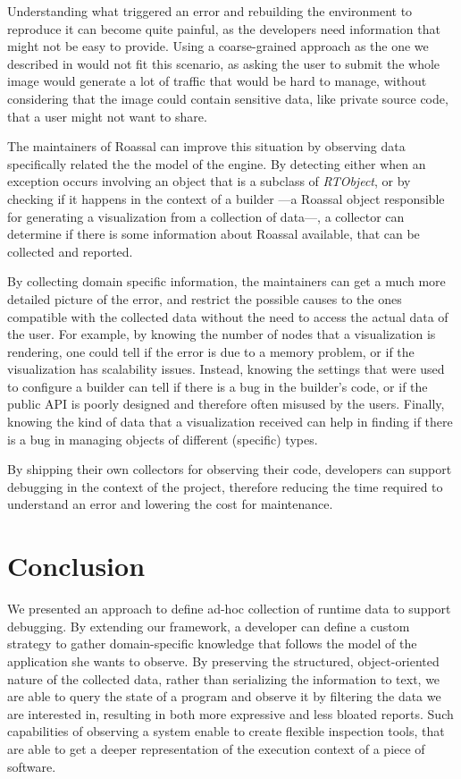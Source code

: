 Understanding what triggered an error and rebuilding the environment to reproduce it can become quite painful, as the developers need information that might not be easy to provide.
Using a coarse-grained approach as the one we described in  would not fit this scenario, as asking the user to submit the whole image would generate a lot of traffic that would be hard to manage, without considering that the image could contain sensitive data, like private source code, that a user might not want to share.

The maintainers of Roassal can improve this situation by observing data specifically related the the model of the engine.
By detecting either when an exception occurs involving an object that is a subclass of \textit{RTObject}, or by checking if it happens in the context of a builder ---a Roassal object responsible for generating a visualization from a collection of data---, a collector can determine if there is some information about Roassal available, that can be collected and reported.

By collecting domain specific information, the maintainers can get a much more detailed picture of the error, and restrict the possible causes to the ones compatible with the collected data without the need to access the actual data of the user. For example, by knowing the number of nodes that a visualization is rendering, one could tell if the error is due to a memory problem, or if the visualization has scalability issues. Instead, knowing the settings that were used to configure a builder can tell if there is a bug in the builder's code, or if the public API is poorly designed and therefore often misused by the users. Finally, knowing the kind of data that a visualization received can help in finding if there is a bug in managing objects of different (specific) types.

By shipping their own collectors for observing their code, developers can support debugging in the context of the project, therefore reducing the time required to understand an error and lowering the cost for maintenance.


\section{Conclusion}\label{sec:conclusion}

We presented an approach to define ad-hoc collection of runtime data to support debugging. By extending our framework, a developer can define a custom strategy to gather domain-specific knowledge that follows the model of the application she wants to observe.
By preserving the structured, object-oriented nature of the collected data, rather than serializing the information to text, we are able to query the state of a program  and observe it by filtering the data we are interested in, resulting in both more expressive and less bloated reports.
Such capabilities of observing a system enable to create flexible inspection tools, that are able to get a deeper representation of the execution context of a piece of software.


